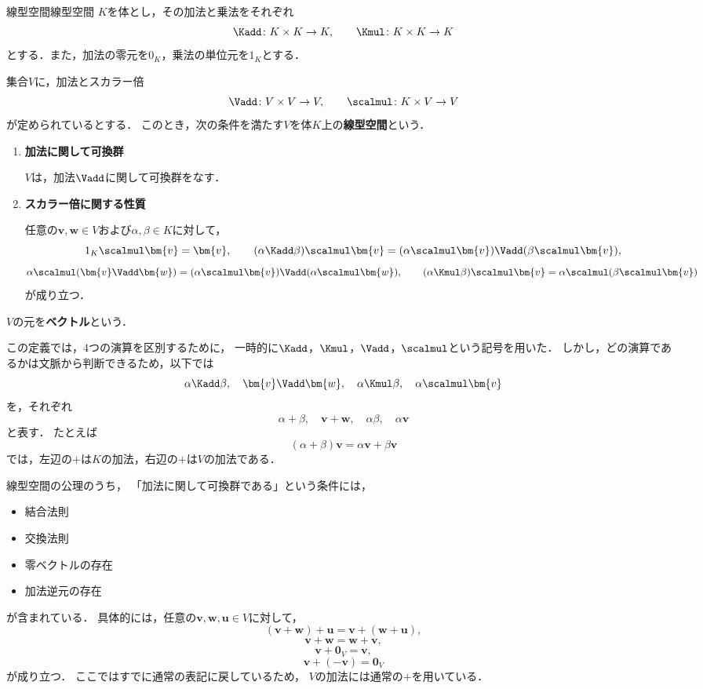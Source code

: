 \begin{definition}{線型空間}{線型空間}
  $K$を体とし，その加法と乗法をそれぞれ
  \[
    \Kadd\colon K\times K\to K,
    \qquad
    \Kmul\colon K\times K\to K
  \]
  とする．また，加法の零元を$0_K$，乗法の単位元を$1_K$とする．

  集合$V$に，加法とスカラー倍
  \[
    \Vadd\colon V\times V\to V,
    \qquad
    \scalmul\colon K\times V\to V
  \]
  が定められているとする．
  このとき，次の条件を満たす$V$を体$K$上の\textbf{線型空間}という．

  \begin{enumerate}[label=(\roman*),leftmargin=3.2em]
    \item \textbf{加法に関して可換群}

    $V$は，加法$\Vadd$に関して可換群をなす．

    \item \textbf{スカラー倍に関する性質}

    任意の$\bm{v},\bm{w}\in V$および$\alpha,\beta\in K$に対して，
    \[
      1_K\scalmul\bm{v}=\bm{v},
      \qquad
      (\alpha\Kadd\beta)\scalmul\bm{v}
      =
      (\alpha\scalmul\bm{v})\Vadd(\beta\scalmul\bm{v}),
    \]
    \[
      \alpha\scalmul(\bm{v}\Vadd\bm{w})
      =
      (\alpha\scalmul\bm{v})\Vadd(\alpha\scalmul\bm{w}),
      \qquad
      (\alpha\Kmul\beta)\scalmul\bm{v}
      =
      \alpha\scalmul(\beta\scalmul\bm{v})
    \]
    が成り立つ．
  \end{enumerate}

  $V$の元を\textbf{ベクトル}という．
\end{definition}

この定義では，$4$つの演算を区別するために，
一時的に$\Kadd$，$\Kmul$，$\Vadd$，$\scalmul$という記号を用いた．
しかし，どの演算であるかは文脈から判断できるため，以下では
\[
  \alpha\Kadd\beta,\quad
  \bm{v}\Vadd\bm{w},\quad
  \alpha\Kmul\beta,\quad
  \alpha\scalmul\bm{v}
\]
を，それぞれ
\[
  \alpha+\beta,\quad
  \bm{v}+\bm{w},\quad
  \alpha\beta,\quad
  \alpha\bm{v}
\]
と表す．
たとえば
\[
  (\alpha+\beta)\bm{v}
  =
  \alpha\bm{v}+\beta\bm{v}
\]
では，左辺の$+$は$K$の加法，右辺の$+$は$V$の加法である．

\begin{remark}[加法に関する可換群の条件]
線型空間の公理のうち，
「加法に関して可換群である」という条件には，

\begin{itemize}
  \item 結合法則
  \item 交換法則
  \item 零ベクトルの存在
  \item 加法逆元の存在
\end{itemize}

が含まれている．
具体的には，任意の$\bm{v},\bm{w},\bm{u}\in V$に対して，
\[
  (\bm{v}+\bm{w})+\bm{u}
  =
  \bm{v}+(\bm{w}+\bm{u}),
\]
\[
  \bm{v}+\bm{w}
  =
  \bm{w}+\bm{v},
\]
\[
  \bm{v}+\bm{0}_V
  =
  \bm{v},
\]
\[
  \bm{v}+(-\bm{v})
  =
  \bm{0}_V
\]
が成り立つ．
ここではすでに通常の表記に戻しているため，
$V$の加法には通常の$+$を用いている．
\end{remark}


